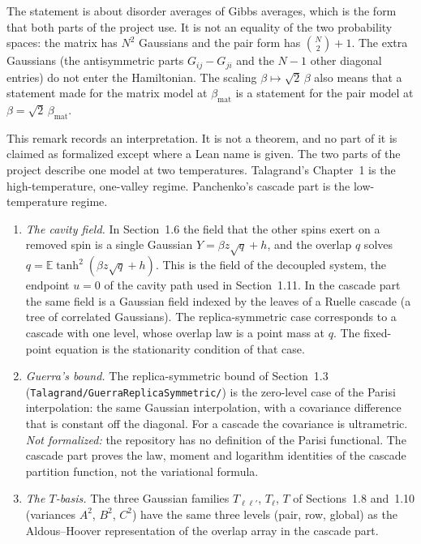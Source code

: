 \begin{remark}\label{rem:sg-tal:hamiltonian-bridge}
The statement is about disorder averages of Gibbs averages, which is the form that both parts of the project use. It is not an equality of the two probability spaces:
the matrix has $N^2$ Gaussians and the pair form has $\binom N2+1$. The extra Gaussians (the antisymmetric parts $G_{ij}-G_{ji}$ and the $N-1$ other diagonal entries) do not enter the Hamiltonian.
The scaling $\beta\mapsto\sqrt2\,\beta$ also means that a statement made for the matrix model at $\beta_{\mathrm{mat}}$ is a statement for the pair model at $\beta=\sqrt2\,\beta_{\mathrm{mat}}$.
\end{remark}

\begin{remark}\label{rem:sg-tal:cascade-link}
This remark records an interpretation. It is not a theorem, and no part of it is claimed as formalized except where a Lean name is given.
The two parts of the project describe one model at two temperatures. Talagrand's Chapter~1 is the high-temperature, one-valley regime. Panchenko's cascade part is the low-temperature regime.
\begin{enumerate}
\item \emph{The cavity field.} In Section~1.6 the field that the other spins exert on a removed spin is a single Gaussian $Y=\beta z\sqrt q+h$, and the overlap $q$ solves $q=\mathbb E\tanh^2(\beta z\sqrt q+h)$.
 This is the field of the decoupled system, the endpoint $u=0$ of the cavity path used in Section~1.11. In the cascade part the same field is a Gaussian field indexed by the leaves of a Ruelle cascade (a tree of correlated Gaussians).
 The replica-symmetric case corresponds to a cascade with one level, whose overlap law is a point mass at $q$. The fixed-point equation is the stationarity condition of that case.
\item \emph{Guerra's bound.} The replica-symmetric bound of Section~1.3 (\texttt{Talagrand/GuerraReplicaSymmetric/}) is the zero-level case of the Parisi interpolation: the same Gaussian interpolation, with a covariance difference that is constant off the diagonal.
 For a cascade the covariance is ultrametric. \emph{Not formalized:} the repository has no definition of the Parisi functional. The cascade part proves the law, moment and logarithm identities of the cascade partition function, not the variational formula.
\item \emph{The $T$-basis.} The three Gaussian families $T_{\ell\ell'}$, $T_\ell$, $T$ of Sections~1.8 and~1.10 (variances $A^2$, $B^2$, $C^2$) have the same three levels (pair, row, global) as the Aldous--Hoover representation of the overlap array in the cascade part.

\end{enumerate}
\end{remark}
